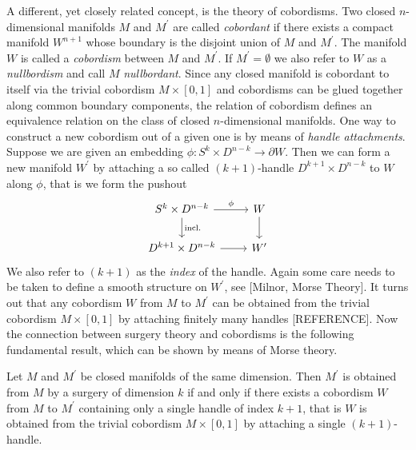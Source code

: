 A different, yet closely related concept, is the theory of cobordisms. Two closed $n$-dimensional manifolds $M$ and $M^\prime$ are called \textit{cobordant} if there exists a compact manifold $W^{n+1}$ whose boundary is the disjoint union of $M$ and $M^\prime$. The manifold $W$ is called a \textit{cobordism} between $M$ and $M^\prime$. If $M^\prime = \emptyset$ we also refer to $W$ as a \textit{nullbordism} and call $M$ \textit{nullbordant}. Since any closed manifold is cobordant to itself via the trivial cobordism $M \times [0,1]$ and cobordisms can be glued together along common boundary components, the relation of cobordism defines an equivalence relation on the class of closed $n$-dimensional manifolds. One way to construct a new cobordism out of a given one is by means of \textit{handle attachments}. Suppose we are given an embedding $\phi \colon S^k \times D^{n-k} \to \partial W$. Then we can form a new manifold $W^\prime$ by attaching a so called $(k+1)$-handle $D^{k+1} \times D^{n-k}$ to $W$ along $\phi$, that is we form the pushout 
\[\begin{tikzcd}
	{S^k \times D^{n-k}} & W \\
	{D^{k+1} \times D^{n-k}} & {W^\prime}
	\arrow["\phi", from=1-1, to=1-2]
	\arrow["{\mathrm{incl.}}", from=1-1, to=2-1]
	\arrow[from=1-2, to=2-2]
	\arrow[from=2-1, to=2-2]
\end{tikzcd}\]
We also refer to $(k+1)$ as the \textit{index} of the handle.
Again some care needs to be taken to define a smooth structure on $W^\prime$, see [Milnor, Morse Theory]. It turns out that any cobordism $W$ from $M$ to $M^\prime$ can be obtained from the trivial cobordism $M \times [0,1]$ by attaching finitely many handles [REFERENCE]. Now the connection between surgery theory and cobordisms is the following fundamental result, which can be shown by means of Morse theory. 

\begin{theorem}
    Let $M$ and $M^\prime$ be closed manifolds of the same dimension. Then $M^\prime$ is obtained from $M$ by a surgery of dimension $k$ if and only if there exists a cobordism $W$ from $M$ to $M^\prime$ containing only a single handle of index $k+1$, that is $W$ is obtained from the trivial cobordism $M \times [0,1]$ by attaching a single $(k+1)$-handle.
\end{theorem}

